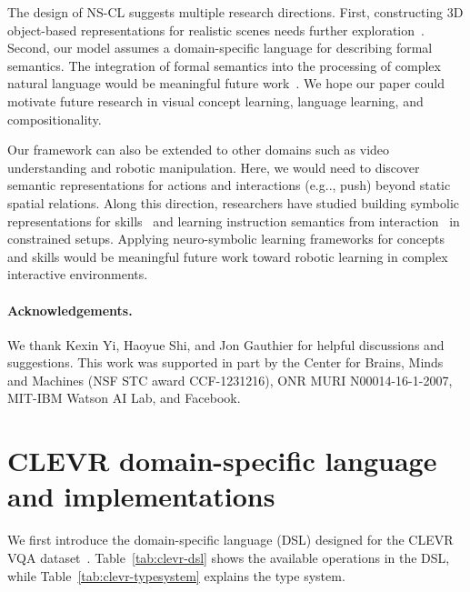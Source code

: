 \documentclass{article} %
\makeatletter
\newcommand{\tbl}[1]{Table~\ref{#1}}
\DeclareRobustCommand\onedot{\futurelet\@let@token\@onedot}
\def\@onedot{\ifx\@let@token.\else.\null\fi\xspace}
\def\eg{e.g\onedot} \def\Eg{E.g\onedot}
\newcommand{\model}{NS-CL\xspace}
\newcommand{\myparagraph}[1]{\vspace{-3pt}\paragraph{#1}}
\newcommand{\revisioncolor}{}
\makeatother
\begin{document}
{\revisioncolor
The design of \model suggests multiple research directions. First, constructing 3D object-based representations for realistic scenes needs further exploration~\citep{Anderson2017BottomUp,Baradel2018Object}. %
Second, our model assumes a domain-specific language for describing formal semantics. The integration of formal semantics into the processing of complex natural language would be meaningful future work~\citep{Artzi2013Weakly,Oh2017Zero}. We hope our paper could motivate future research in visual concept learning, language learning, and compositionality. 

Our framework can also be extended to other domains such as video understanding and robotic manipulation. %
Here, we would need to discover semantic representations for actions and interactions (\eg, push) beyond static spatial relations. %
Along this direction, researchers have studied building symbolic representations for skills~\citep{Konidaris2018Skills} and learning instruction semantics from interaction~\citep{Oh2017Zero} in constrained setups. Applying neuro-symbolic learning frameworks for concepts and skills would be meaningful future work toward robotic learning in complex interactive environments. %
}
\myparagraph{Acknowledgements.}
We thank Kexin Yi, Haoyue Shi, and Jon Gauthier for helpful discussions and suggestions. This work was supported in part by the Center for Brains, Minds and Machines (NSF STC award CCF-1231216), ONR MURI N00014-16-1-2007, MIT-IBM Watson AI Lab, and Facebook. 



%
\newpage

\appendix

\section{CLEVR domain-specific language and implementations}
\label{sec:app:dsl}
We first introduce the domain-specific language (DSL) designed for the CLEVR VQA dataset~\citep{Johnson2017CLEVR}. \tbl{tab:clevr-dsl} shows the available operations in the DSL, while \tbl{tab:clevr-typesystem} explains the type system.
\end{document}
